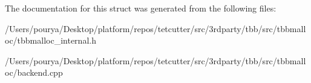 The documentation for this struct was generated from the following files\+:\begin{DoxyCompactItemize}
\item 
/\+Users/pourya/\+Desktop/platform/repos/tetcutter/src/3rdparty/tbb/src/tbbmalloc/tbbmalloc\+\_\+internal.\+h\item 
/\+Users/pourya/\+Desktop/platform/repos/tetcutter/src/3rdparty/tbb/src/tbbmalloc/backend.\+cpp\end{DoxyCompactItemize}
